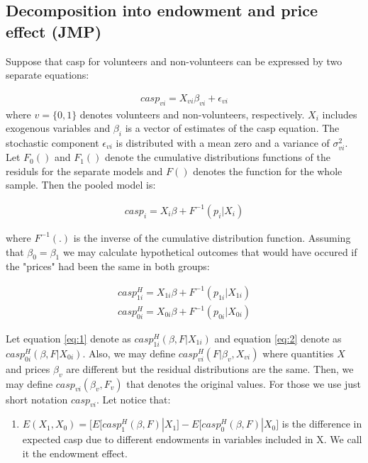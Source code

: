 \documentclass[10pt, letterpaper]{article}
\begin{document}
\begin{spacing}{1.4}
\subsection*{Decomposition into endowment and price effect (JMP)}

Suppose that casp for volunteers and non-volunteers can be expressed by two separate equations:

  \begin{eqnarray}
	casp_{vi}= X_{vi}\beta_{vi}+ \epsilon_{vi}
 \end{eqnarray}
where $v=\big\{0,1\big\}$ denotes volunteers and non-volunteers, respectively. $X_{i}$ includes exogenous variables and $\beta_{i}$ is a vector of estimates of the casp equation. The stochastic component $\epsilon_{vi}$ is distributed with a mean zero and a variance of $\sigma_{vi}^{2}$. Let $F_{0}()$ and $F_{1}()$ denote  the cumulative distributions functions of the residuls for the separate models and $F()$ denotes the function for the whole sample. Then the pooled model is:  

  \begin{eqnarray}
	casp_{i}= X_{i}\beta+ F^{-1}(p_{i}|X_{i})
 \end{eqnarray}

where $F^{-1}(.)$ is the inverse of the cumulative distribution function. Assuming that $\beta_{0}=\beta_{1}$ we may calculate hypothetical outcomes that would have occured if the "prices" had been the same in both groups:

  \begin{eqnarray} 
	casp^{H}_{1i}= X_{1i}\beta+ F^{-1}(p_{1i}|X_{1i}) \label{eq:1} \\
	casp^{H}_{0i}= X_{0i}\beta+ F^{-1}(p_{0i}|X_{0i}) \label{eq:2}
 \end{eqnarray}

Let equation \ref{eq:1} denote as $casp^{H}_{1i}(\beta,F|X_{1i})$ and equation \ref{eq:2} denote as $casp^{H}_{0i}(\beta,F|X_{0i})$. Also, we may define $casp^{H}_{vi}(F|\beta_{v},X_{vi})$ where quantities $X$ and prices $ \beta_{v}$ are different but the residual distributions are the same. Then, we may define $ casp_{vi}(\beta_{v},F_{v})$ that denotes the original values. For those we use just short notation  $casp_{vi}$.
Let notice that:

\begin{enumerate}

\item  $ E(X_{1},X_{0})=\bigg[E[casp^{H}_{1}(\beta,F)|X_{1}]-E[casp^{H}_{0}(\beta,F)|X_{0}\bigg]$ is the difference in expected casp due to different endowments in variables included in X. We call it the endowment effect. 


\end{enumerate}
\end{spacing}
\end{document}
